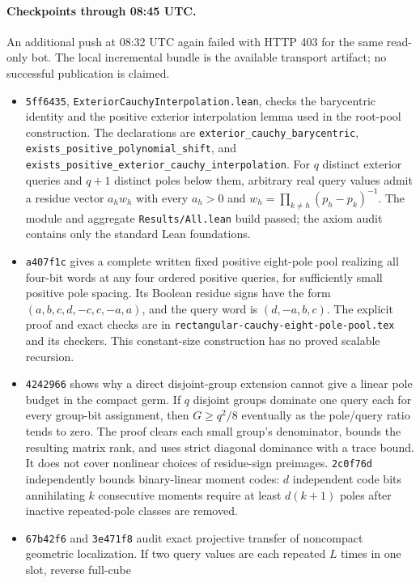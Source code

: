 \documentclass[11pt]{article}
\begin{document}
\paragraph{Checkpoints through 08:45 UTC.}
An additional push at 08:32 UTC again failed with HTTP 403 for the
same read-only bot. The local incremental bundle is the available
transport artifact; no successful publication is claimed.
\begin{itemize}
\item \texttt{5ff6435}, \texttt{ExteriorCauchyInterpolation.lean},
checks the barycentric identity and the positive exterior interpolation
lemma used in the root-pool construction. The declarations are
\texttt{exterior\_cauchy\_barycentric},
\texttt{exists\_positive\_polynomial\_shift}, and
\texttt{exists\_positive\_exterior\_cauchy\_interpolation}.
For $q$ distinct exterior queries and $q+1$ distinct poles below them,
arbitrary real query values admit a residue vector $a_hw_h$ with
every $a_h>0$ and $w_h=\prod_{k\ne h}(p_h-p_k)^{-1}$.
The module and aggregate \texttt{Results/All.lean} build passed;
the axiom audit contains only the standard Lean foundations.
\item \texttt{a407f1c} gives a complete written fixed positive
eight-pole pool realizing all four-bit words at any four ordered
positive queries, for sufficiently small positive pole spacing.
Its Boolean residue signs have the form
$(a,b,c,d,-c,c,-a,a)$, and the query word is $(d,-a,b,c)$.
The explicit proof and exact checks are in
\texttt{rectangular-cauchy-eight-pole-pool.tex} and its checkers.
This constant-size construction has no proved scalable recursion.
\item \texttt{4242966} shows why a direct disjoint-group extension
cannot give a linear pole budget in the compact germ. If $q$ disjoint
groups dominate one query each for every group-bit assignment, then
$G\geq q^2/8$ eventually as the pole/query ratio tends to zero.
The proof clears each small group's denominator, bounds the resulting
matrix rank, and uses strict diagonal dominance with a trace bound.
It does not cover nonlinear choices of residue-sign preimages.
\texttt{2c0f76d} independently bounds binary-linear moment codes:
$d$ independent code bits annihilating $k$ consecutive moments require
at least $d(k+1)$ poles after inactive repeated-pole classes are removed.
\item \texttt{67b42f6} and \texttt{3e471f8} audit exact projective
transfer of noncompact geometric localization. If two query values
are each repeated $L$ times in one slot, reverse full-cube

\end{itemize}
\end{document}
